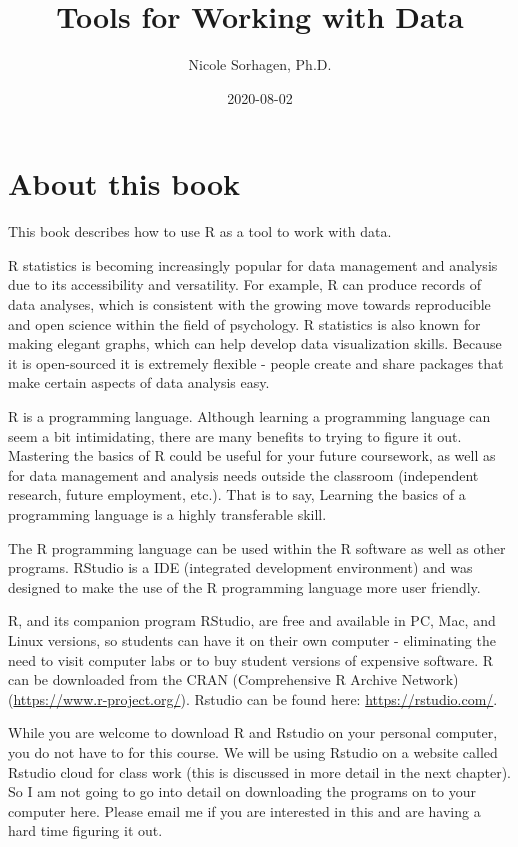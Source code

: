 \documentclass[
]{book}
\title{Tools for Working with Data}
\author{Nicole Sorhagen, Ph.D.}
\date{2020-08-02}
\begin{document}
\maketitle

{
\setcounter{tocdepth}{1}
\tableofcontents
}
\hypertarget{about-this-book}{%
\chapter{About this book}\label{about-this-book}}

This book describes how to use R as a tool to work with data.

R statistics is becoming increasingly popular for data management and analysis due to its accessibility and versatility. For example, R can produce records of data analyses, which is consistent with the growing move towards reproducible and open science within the field of psychology. R statistics is also known for making elegant graphs, which can help develop data visualization skills. Because it is open-sourced it is extremely flexible - people create and share packages that make certain aspects of data analysis easy.

R is a programming language. Although learning a programming language can seem a bit intimidating, there are many benefits to trying to figure it out. Mastering the basics of R could be useful for your future coursework, as well as for data management and analysis needs outside the classroom (independent research, future employment, etc.). That is to say, Learning the basics of a programming language is a highly transferable skill.

The R programming language can be used within the R software as well as other programs. RStudio is a IDE (integrated development environment) and was designed to make the use of the R programming language more user friendly.

R, and its companion program RStudio, are free and available in PC, Mac, and Linux versions, so students can have it on their own computer - eliminating the need to visit computer labs or to buy student versions of expensive software. R can be downloaded from the CRAN (Comprehensive R Archive Network) (\url{https://www.r-project.org/}). Rstudio can be found here: \url{https://rstudio.com/}.

While you are welcome to download R and Rstudio on your personal computer, you do not have to for this course. We will be using Rstudio on a website called Rstudio cloud for class work (this is discussed in more detail in the next chapter). So I am not going to go into detail on downloading the programs on to your computer here. Please email me if you are interested in this and are having a hard time figuring it out.
\end{document}
